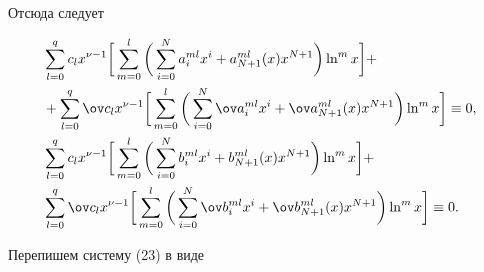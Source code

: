  


Отсюда следует 


\begin{equation} 


\begin{split} 


&\sum^q_{l=0}c_l x^{\nu-1}\bigg[\sum^l_{m=0}\bigg(\sum^N_{i=0} 


a^{ml}_i x^i+a^{ml}_{N+1}(x)x^{N+1}\bigg)\ln^m x\bigg]+ \\


&+\sum^q_{l=0}\ov c_l x^{\nu-1}\bigg[\sum^l_{m=0}\bigg( 


\sum^N_{i=0}\ov a^{ml}_i x^i+\ov a^{ml}_{N+1}(x) 


x^{N+1}\bigg)\ln^m x\bigg]\equiv0,\\ 


% 


&\sum^q_{l=0}c_l x^{\nu-1}\bigg[\sum^l_{m=0}\bigg(\sum^N_{i=0} 


b^{ml}_i x^i+b^{ml}_{N+1}(x)x^{N+1}\bigg)\ln^m x\bigg]+ \\


&\sum^q_{l=0}\ov c_l x^{\nu-1}\bigg[\sum^l_{m=0}\bigg( 


\sum^N_{i=0}\ov b^{ml}_i x^i+\ov b^{ml}_{N+1}(x) 


x^{N+1}\bigg)\ln^m x\bigg]\equiv0.


\end{split} 


\end{equation} 


Перепишем систему (23) в виде 


